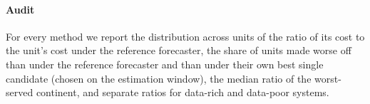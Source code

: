 \paragraph{Audit}
For every method we report the distribution across units of the ratio of its cost to the unit's cost under the reference forecaster, the share of units made worse off than under the reference forecaster and than under their own best single candidate (chosen on the estimation window), the median ratio of the worst-served continent, and separate ratios for data-rich and data-poor systems.
